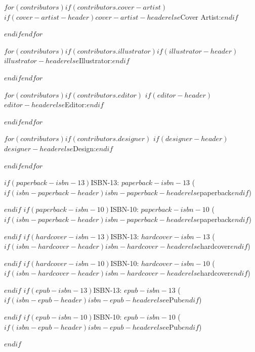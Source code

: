     \vspace{.5cm}
    
    \begin{center}

      $for(contributors)$$if(contributors.cover-artist)$ $if(cover-artist-header)$$cover-artist-header$$else$Cover Artist:$endif$ \coverartist \par$endif$$endfor$

      $for(contributors)$$if(contributors.illustrator)$\noindent $if(illustrator-header)$$illustrator-header$$else$Illustrator:$endif$ \illustrator \par$endif$$endfor$
      
      $for(contributors)$$if(contributors.editor)$ $if(editor-header)$$editor-header$$else$Editor:$endif$ \editor \par$endif$$endfor$
      
      $for(contributors)$$if(contributors.designer)$ $if(designer-header)$$designer-header$$else$Design:$endif$ \designer \par$endif$$endfor$
   
      \vspace{0.4cm}
      
  $if(paperback-isbn-13)$\noindent ISBN-13: {$paperback-isbn-13$} ($if(isbn-paperback-header)$$isbn-paperback-header$$else$paperback$endif$) \par $endif$
  $if(paperback-isbn-10)$\noindent ISBN-10: {$paperback-isbn-10$} ($if(isbn-paperback-header)$$isbn-paperback-header$$else$paperback$endif$) \par $endif$
  $if(hardcover-isbn-13)$\noindent ISBN-13: {$hardcover-isbn-13$} ($if(isbn-hardcover-header)$$isbn-hardcover-header$$else$hardcover$endif$) \par $endif$
  $if(hardcover-isbn-10)$\noindent ISBN-10: {$hardcover-isbn-10$} ($if(isbn-hardcover-header)$$isbn-hardcover-header$$else$hardcover$endif$) \par $endif$
  $if(epub-isbn-13)$\noindent ISBN-13: {$epub-isbn-13$} ($if(isbn-epub-header)$$isbn-epub-header$$else$ePub$endif$) \par $endif$
  $if(epub-isbn-10)$\noindent ISBN-10: {$epub-isbn-10$} ($if(isbn-epub-header)$$isbn-epub-header$$else$ePub$endif$) \par $endif$
      
    \end{center}
    
\clearpage